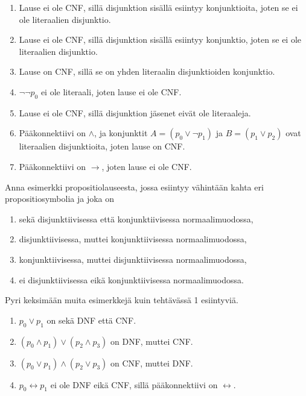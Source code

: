 \documentclass[11pt,a4paper]{amsart}
\begin{document}
\begin{solution}
\leavevmode\par
\begin{enumerate}[label=\alph*), nosep]
\item Lause ei ole CNF, sillä disjunktion sisällä esiintyy konjunktioita,
joten se ei ole literaalien disjunktio.
\item Lause ei ole CNF, sillä disjunktion sisällä esiintyy konjunktio,
joten se ei ole literaalien disjunktio.
\item Lause on CNF, sillä se on yhden literaalin disjunktioiden konjunktio.
\item \(\neg \neg p_0\) ei ole literaali, joten lause ei ole CNF.
\item Lause ei ole CNF, sillä disjunktion jäsenet eivät ole literaaleja.
\item Pääkonnektiivi on \(\land\), ja konjunktit \(A = (p_0 \lor \neg p_1)\)
ja \(B = (p_1 \lor p_2)\) ovat literaalien disjunktioita, joten lause
on CNF.
\item Pääkonnektiivi on \(\to\), joten lause ei ole CNF.
\end{enumerate}
\end{solution}

\begin{exercise}
Anna esimerkki propositiolauseesta, jossa esiintyy vähintään kahta eri
propositiosymbolia ja joka on
\begin{enumerate}[label=\alph*), nosep]
\item sekä disjunktiivisessa että konjunktiivisessa normaalimuodossa,
\item disjunktiivisessa, muttei konjunktiivisessa normaalimuodossa,
\item konjunktiivisessa, muttei disjunktiivisessa normaalimuodossa,
\item ei disjunktiivisessa eikä konjunktiivisessa normaalimuodossa.
\end{enumerate}
Pyri keksimään muita esimerkkejä kuin tehtävässä 1 esiintyviä.
\end{exercise}

\begin{solution}
\leavevmode\par
\begin{enumerate}[label=\alph*), nosep]
\item \(p_0 \lor p_1\) on sekä DNF että CNF.
\item \((p_0 \land p_1) \lor (p_2 \land p_3)\) on DNF, muttei CNF.
\item \((p_0 \lor p_1) \land (p_2 \lor p_3)\) on CNF, muttei DNF.
\item \(p_0 \leftrightarrow p_1\) ei ole DNF eikä CNF, sillä pääkonnektiivi
on \(\leftrightarrow\).
\end{enumerate}
\end{solution}
\end{document}
